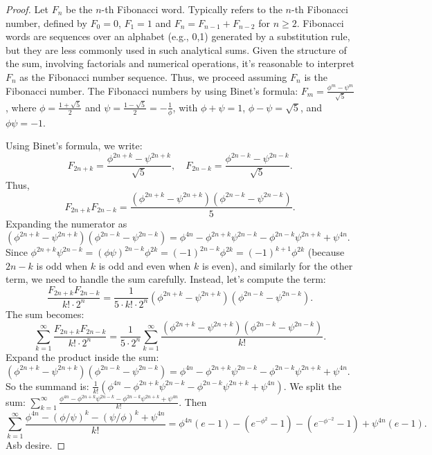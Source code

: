 \documentclass[12pt, a4paper]{article}
\begin{document}
\begin{proof}
Let $F_n$ be the $n$-th Fibonacci word. Typically refers to the $n$-th Fibonacci number, defined by $F_0 = 0$, $F_1 = 1$ and $F_n = F_{n-1} + F_{n-2}$ for $n \geq 2$. Fibonacci words are sequences over an alphabet (e.g., {0,1}) generated by a substitution rule, but they are less commonly used in such analytical sums. Given the structure of the sum, involving factorials and numerical operations, it’s reasonable to interpret $F_n$ as the Fibonacci number sequence. Thus, we proceed assuming $F_n$ is the Fibonacci number. The Fibonacci numbers by using Binet’s formula: $F_m = \frac{\phi^m - \psi^m}{\sqrt{5}}$, where $\phi = \frac{1 + \sqrt{5}}{2}$ and $\psi = \frac{1 - \sqrt{5}}{2} = -\frac{1}{\phi}$, with $\phi + \psi = 1$, $\phi - \psi = \sqrt{5}$, and $\phi \psi = -1$. \par 
\noindent
Using Binet’s formula, we write: 
\[
F_{2n+k} = \frac{\phi^{2n+k} - \psi^{2n+k}}{\sqrt{5}}, \quad F_{2n-k} = \frac{\phi^{2n-k} - \psi^{2n-k}}{\sqrt{5}}.
\]
Thus, 
\[
F_{2n+k} F_{2n-k} = \frac{(\phi^{2n+k} - \psi^{2n+k})(\phi^{2n-k} - \psi^{2n-k})}{5}.
\] 
Expanding the numerator as $(\phi^{2n+k} - \psi^{2n+k})(\phi^{2n-k} - \psi^{2n-k}) = \phi^{4n} - \phi^{2n+k} \psi^{2n-k} - \phi^{2n-k} \psi^{2n+k} + \psi^{4n}$. Since $\phi^{2n+k} \psi^{2n-k} = (\phi \psi)^{2n-k} \phi^{2k} = (-1)^{2n-k} \phi^{2k} = (-1)^{k+1} \phi^{2k}$ (because $2n-k$ is odd when $k$ is odd and even when $k$ is even), and similarly for the other term, we need to handle the sum carefully. Instead, let’s compute the term: \[\frac{F_{2n+k} F_{2n-k}}{k! \cdot 2^n} = \frac{1}{5 \cdot k! \cdot 2^n} (\phi^{2n+k} - \psi^{2n+k})(\phi^{2n-k} - \psi^{2n-k}).\]
The sum becomes: \[\sum_{k=1}^\infty \frac{F_{2n+k} F_{2n-k}}{k! \cdot 2^n} = \frac{1}{5 \cdot 2^n} \sum_{k=1}^\infty \frac{(\phi^{2n+k} - \psi^{2n+k})(\phi^{2n-k} - \psi^{2n-k})}{k!}.\]
Expand the product inside the sum: $(\phi^{2n+k} - \psi^{2n+k})(\phi^{2n-k} - \psi^{2n-k}) = \phi^{4n} - \phi^{2n+k} \psi^{2n-k} - \phi^{2n-k} \psi^{2n+k} + \psi^{4n}$. So the summand is: $\frac{1}{k!} \left( \phi^{4n} - \phi^{2n+k} \psi^{2n-k} - \phi^{2n-k} \psi^{2n+k} + \psi^{4n} \right)$. We split the sum: $\sum_{k=1}^\infty \frac{\phi^{4n} - \phi^{2n+k} \psi^{2n-k} - \phi^{2n-k} \psi^{2n+k} + \psi^{4n}}{k!}$. Then
\[
\sum_{k=1}^\infty \frac{\phi^{4n} - (\phi / \psi)^k - (\psi / \phi)^k + \psi^{4n}}{k!} = \phi^{4n} (e - 1) - (e^{-\phi^2} - 1) - (e^{-\phi^{-2}} - 1) + \psi^{4n} (e - 1).
\]
Asb desire.
\end{proof}
\end{document}

